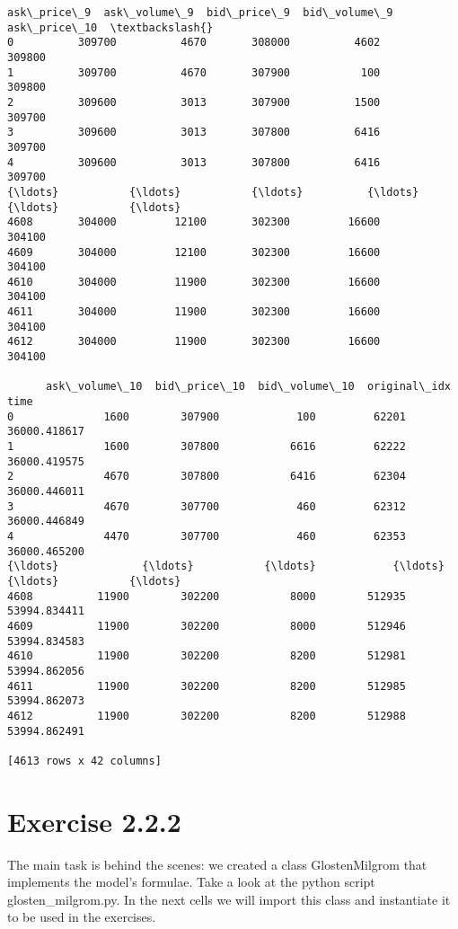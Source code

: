 \documentclass[9pt]{article}
\begin{document}
\begin{scriptsize}
\begin{tcolorbox}[breakable, size=fbox, boxrule=.5pt, pad at break*=1mm, opacityfill=0]
\begin{Verbatim}[commandchars=\\\{\}]
      ask\_price\_9  ask\_volume\_9  bid\_price\_9  bid\_volume\_9  ask\_price\_10  \textbackslash{}
0          309700          4670       308000          4602        309800
1          309700          4670       307900           100        309800
2          309600          3013       307900          1500        309700
3          309600          3013       307800          6416        309700
4          309600          3013       307800          6416        309700
{\ldots}           {\ldots}           {\ldots}          {\ldots}           {\ldots}           {\ldots}
4608       304000         12100       302300         16600        304100
4609       304000         12100       302300         16600        304100
4610       304000         11900       302300         16600        304100
4611       304000         11900       302300         16600        304100
4612       304000         11900       302300         16600        304100

      ask\_volume\_10  bid\_price\_10  bid\_volume\_10  original\_idx          time
0              1600        307900            100         62201  36000.418617
1              1600        307800           6616         62222  36000.419575
2              4670        307800           6416         62304  36000.446011
3              4670        307700            460         62312  36000.446849
4              4470        307700            460         62353  36000.465200
{\ldots}             {\ldots}           {\ldots}            {\ldots}           {\ldots}           {\ldots}
4608          11900        302200           8000        512935  53994.834411
4609          11900        302200           8000        512946  53994.834583
4610          11900        302200           8200        512981  53994.862056
4611          11900        302200           8200        512985  53994.862073
4612          11900        302200           8200        512988  53994.862491

[4613 rows x 42 columns]
\end{Verbatim}
\end{tcolorbox}
\end{scriptsize}
        
    \hypertarget{exercise-2.2.2}{%
\section*{Exercise 2.2.2}\label{exercise-2.2.2}}

    The main task is behind the scenes: we created a class GlostenMilgrom
that implements the model's formulae. Take a look at the python script
glosten\_milgrom.py. In the next cells we will import this class and
instantiate it to be used in the exercises.
\end{document}
